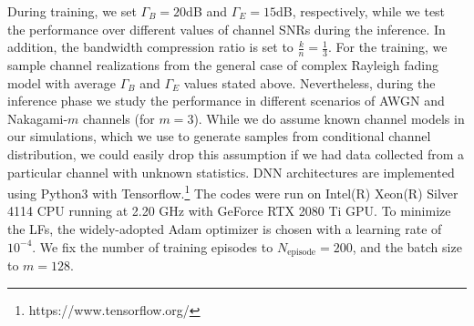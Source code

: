 \documentclass[conference]{IEEEtran}
\begin{document}
{{	%
	During training,  we set $\Gamma_{B} = 20$dB and $\Gamma_{E} = 15$dB, respectively, while we test the performance over different values of channel SNRs during the inference.     
	 In addition, the bandwidth compression ratio 	is set to  $\frac{k}{n}=\frac{1}{3}$.    
	For the training, we sample channel realizations from the general case of complex Rayleigh  fading  model with average $\Gamma_{B}$ and $\Gamma_{E}$ values stated above.  	 
	Nevertheless, during the inference phase we study the performance  in  different scenarios of AWGN and Nakagami-$m$ channels (for $m=3$).  
 While we do assume  known channel models in our simulations, which we use to generate samples from conditional channel distribution, we could easily drop this assumption if we had data collected from a particular channel with unknown statistics.
	 DNN architectures are implemented  using  {Python3 with  Tensorflow.\footnote{https://www.tensorflow.org/}}  
{The codes  were run  
	on Intel(R) Xeon(R) Silver 4114  CPU running at 2.20 GHz with GeForce RTX 2080 Ti GPU.}
To minimize the LFs, 
 the widely-adopted Adam optimizer is chosen    \cite{adam} with a learning rate of $10^{-4}$. 
We  fix the number of training episodes to ${N}_{\text{episode}}  = 200$, and the batch size to $m=128$. 
	
}}
\end{document}
